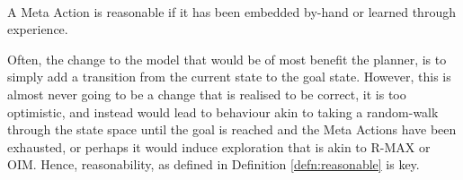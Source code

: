 
\\
\begin{defn}
\label{defn:reasonable}
A Meta Action is reasonable if it has been embedded by-hand or learned through experience.
\end{defn}
Often, the change to the model that would be of most benefit the planner, is to simply add a transition from the current state to the goal state. However, this is almost never going to be a change that is realised to be correct, it is too optimistic, and instead would lead to behaviour akin to taking a random-walk through the state space until the goal is reached and the Meta Actions have been exhausted, or perhaps it would induce exploration that is akin to R-MAX or OIM. Hence, reasonability, as defined in Definition \ref{defn:reasonable} is key.

